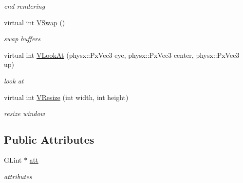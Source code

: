 \begin{DoxyCompactItemize}
\begin{DoxyCompactList}\small\item\em end rendering \item\end{DoxyCompactList}\item 
\hypertarget{classPlatform_1_1RenderGL_a92fc04d1520cce0d43fc221e3a303c25}{
virtual int \hyperlink{classPlatform_1_1RenderGL_a92fc04d1520cce0d43fc221e3a303c25}{VSwap} ()}
\label{classPlatform_1_1RenderGL_a92fc04d1520cce0d43fc221e3a303c25}

\begin{DoxyCompactList}\small\item\em swap buffers \item\end{DoxyCompactList}\item 
\hypertarget{classPlatform_1_1RenderGL_a907aee93274135a7ea0899d484fc9fc2}{
virtual int \hyperlink{classPlatform_1_1RenderGL_a907aee93274135a7ea0899d484fc9fc2}{VLookAt} (physx::PxVec3 eye, physx::PxVec3 center, physx::PxVec3 up)}
\label{classPlatform_1_1RenderGL_a907aee93274135a7ea0899d484fc9fc2}

\begin{DoxyCompactList}\small\item\em look at \item\end{DoxyCompactList}\item 
\hypertarget{classPlatform_1_1RenderGL_a51f8c58f7f409446b96945ca7483e1b8}{
virtual int \hyperlink{classPlatform_1_1RenderGL_a51f8c58f7f409446b96945ca7483e1b8}{VResize} (int width, int height)}
\label{classPlatform_1_1RenderGL_a51f8c58f7f409446b96945ca7483e1b8}

\begin{DoxyCompactList}\small\item\em resize window \item\end{DoxyCompactList}\end{DoxyCompactItemize}
\subsection*{Public Attributes}
\begin{DoxyCompactItemize}
\item 
\hypertarget{classPlatform_1_1RenderGL_afffa969b1adcbf3bbc497d04d347b43c}{
GLint $\ast$ \hyperlink{classPlatform_1_1RenderGL_afffa969b1adcbf3bbc497d04d347b43c}{att}}
\label{classPlatform_1_1RenderGL_afffa969b1adcbf3bbc497d04d347b43c}

\begin{DoxyCompactList}\small\item\em attributes \item\end{DoxyCompactList}\end{DoxyCompactItemize}


